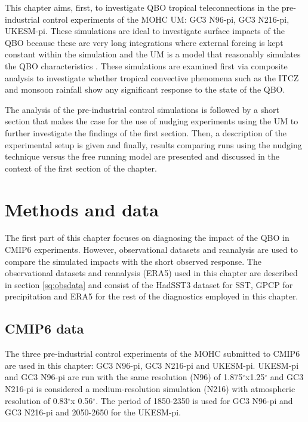 This chapter aims, first, to investigate QBO tropical teleconnections in the pre-industrial control experiments of the MOHC UM: GC3 N96-pi, GC3 N216-pi, UKESM-pi. These simulations are ideal to investigate surface impacts of the QBO because these are very long integrations where external forcing is kept constant within the simulation and the UM is a model that reasonably simulates the QBO characteristics \citep{richter2020}. These simulations are examined first via composite analysis to investigate whether tropical convective phenomena such as the ITCZ and monsoon rainfall show any significant response to the state of the QBO. 

The analysis of the pre-industrial control simulations is followed by a short section that makes the case for the use of nudging experiments using the UM to further investigate the findings of the first section. 
Then, a description of the experimental setup is given and finally, results comparing runs using the nudging technique versus the free running model are presented and discussed in the context of the first section of the chapter. 



\section{Methods and data}

The first part of this chapter focuses on diagnosing the impact of the QBO in CMIP6 experiments. 
However, observational datasets and reanalysis are used to compare the simulated impacts with the short observed response. 
The observational datasets and reanalysis (ERA5) used in this chapter are described in section \ref{sq:obsdata} and consist of the HadSST3 dataset for SST, GPCP for precipitation and ERA5 for the rest of the diagnostics employed in this chapter. 

\subsection{CMIP6 data}

The three pre-industrial control experiments of the MOHC submitted to CMIP6 are used in this chapter: GC3 N96-pi, GC3 N216-pi and UKESM-pi. UKESM-pi and GC3 N96-pi are run with the same resolution (N96) of 1.875$^\circ$x1.25$^\circ$ and GC3 N216-pi is considered a medium-resolution simulation (N216) with atmospheric resolution of 0.83$^\circ$x 0.56$^\circ$. The period of 1850-2350 is used for GC3 N96-pi and GC3 N216-pi and 2050-2650 for the UKESM-pi. 


